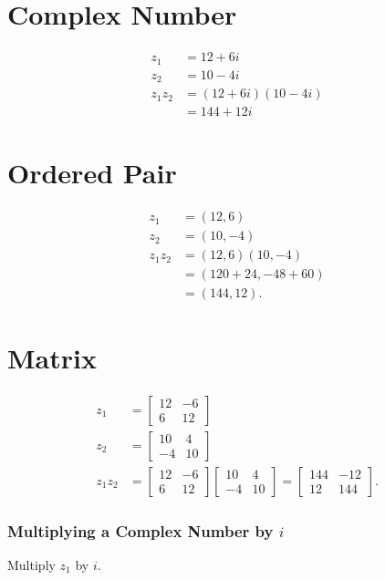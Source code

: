 \section{Complex Number}
$$
\begin{aligned}
z_{1} & =12+6 i \\
z_{2} & =10-4 i \\
z_{1} z_{2} & =(12+6 i)(10-4 i) \\
& =144+12 i
\end{aligned}
$$

\section{Ordered Pair}
$$
\begin{aligned}
z_{1} & =(12,6) \\
z_{2} & =(10,-4) \\
z_{1} z_{2} & =(12,6)(10,-4) \\
& =(120+24,-48+60) \\
& =(144,12) .
\end{aligned}
$$

\section{Matrix}
$$
\begin{aligned}
z_{1} & =\left[\begin{array}{cc}
12 & -6 \\
6 & 12
\end{array}\right] \\
z_{2} & =\left[\begin{array}{cc}
10 & 4 \\
-4 & 10
\end{array}\right] \\
z_{1} z_{2} & =\left[\begin{array}{cc}
12 & -6 \\
6 & 12
\end{array}\right]\left[\begin{array}{cc}
10 & 4 \\
-4 & 10
\end{array}\right]=\left[\begin{array}{cc}
144 & -12 \\
12 & 144
\end{array}\right] .
\end{aligned}
$$

\subsubsection{Multiplying a Complex Number by $i$}
Multiply $z_{1}$ by $i$.

